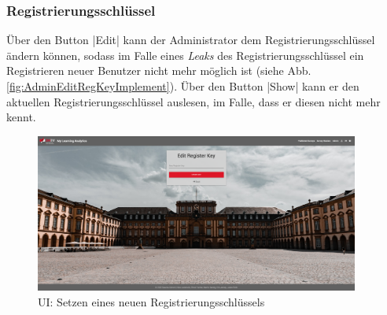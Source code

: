 \subsubsection*{Registrierungsschlüssel \faKey}

Über den Button \jinline|Edit| kann der Administrator dem Registrierungsschlüssel ändern können, sodass im Falle eines \emph{Leaks} des Registrierungsschlüssel ein Registrieren neuer Benutzer nicht mehr möglich ist (siehe Abb. \vref{fig:AdminEditRegKeyImplement}). 
Über den Button \jinline|Show|\xspace kann er den aktuellen Registrierungsschlüssel auslesen, im Falle, dass er diesen nicht mehr kennt. 

\begin{figure}[hp]
	\centering
	\includegraphics[width=0.95\textwidth, keepaspectratio]{img/client/EditSurveyMasterKey.png}
	\captionsetup{justification=centering, format=plain}
	\caption[\acf{UI}: Setzen eines neuen Registrierungsschlüssels]{\acf{UI}: Setzen eines neuen Registrierungsschlüssels \\ \quelleScreenshot}
	\label{fig:AdminEditRegKeyImplement}
\end{figure}